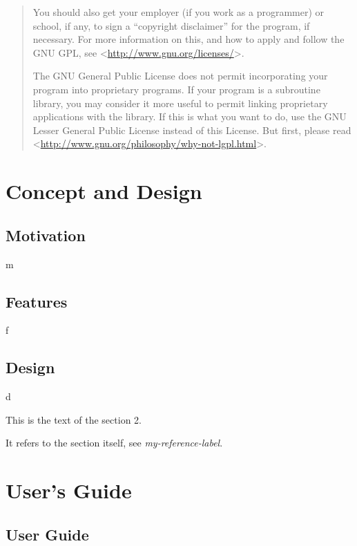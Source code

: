 \documentclass[letterpaper,10pt,english]{sphinxmanual}
\begin{document}
\begin{quote}
You should also get your employer (if you work as a programmer) or school,
if any, to sign a ``copyright disclaimer'' for the program, if necessary.
For more information on this, and how to apply and follow the GNU GPL, see
\textless{}\href{http://www.gnu.org/licenses/}{http://www.gnu.org/licenses/}\textgreater{}.

The GNU General Public License does not permit incorporating your program
into proprietary programs.  If your program is a subroutine library, you
may consider it more useful to permit linking proprietary applications with
the library.  If this is what you want to do, use the GNU Lesser General
Public License instead of this License.  But first, please read
\textless{}\href{http://www.gnu.org/philosophy/why-not-lgpl.html}{http://www.gnu.org/philosophy/why-not-lgpl.html}\textgreater{}.
\end{quote}


\chapter{Concept and Design}
\label{index:concept-and-design}

\section{Motivation}
\label{concept_design:concept-and-design}\label{concept_design:motivation}\label{concept_design::doc}
m


\section{Features}
\label{concept_design:features}
f


\section{Design}
\label{concept_design:design}
d

This is the text of the section 2.

It refers to the section itself, see \emph{my-reference-label}.


\chapter{User's Guide}
\label{index:user-s-guide}

\section{User Guide}
\label{user_guide:user-guide}\label{user_guide::doc}\label{user_guide:id1}
\end{document}
